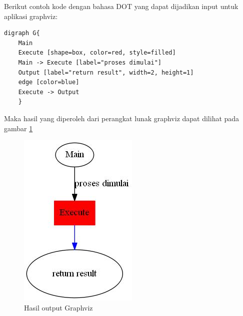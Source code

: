 Berikut contoh kode dengan bahasa DOT yang dapat dijadikan input untuk aplikasi graphviz: 

\begin{lstlisting}[caption={Dot Example}, label={lst:dotExample}]
	digraph G{
	Main
	Execute [shape=box, color=red, style=filled]
	Main -> Execute [label="proses dimulai"]
	Output [label="return result", width=2, height=1]
	edge [color=blue]
	Execute -> Output
	}
\end{lstlisting}

Maka hasil yang diperoleh dari perangkat lunak graphviz dapat dilihat pada gambar \ref{fig:outGraphviz}

\begin{figure}[H]
\centering
\includegraphics[scale=0.9]{Gambar/Graphviz.jpg}
\caption[Hasil output Graphviz]{Hasil output Graphviz} 
\label{fig:outGraphviz}
\end{figure}












